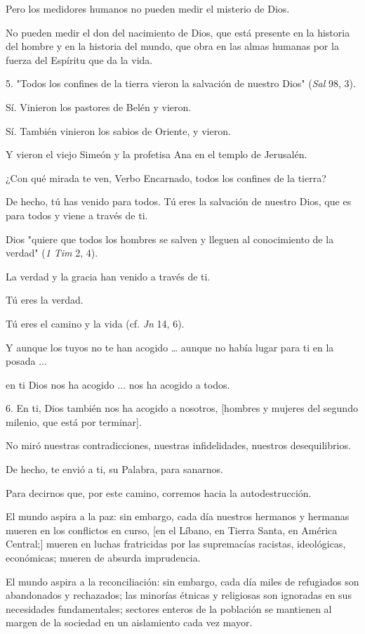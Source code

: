 \begin{body}
\begin{body}
Pero los medidores humanos no pueden medir el misterio de Dios.

No pueden medir el don del nacimiento de Dios, que está presente en la historia del hombre y en la historia del mundo, que obra en las almas humanas por la fuerza del Espíritu que da la vida.

5. "Todos los confines de la tierra vieron la salvación de nuestro Dios" (\emph{Sal} 98, 3).

Sí. Vinieron los pastores de Belén y vieron.

Sí. También vinieron los sabios de Oriente, y vieron.

Y vieron el viejo Simeón y la profetisa Ana en el templo de Jerusalén.

¿Con qué mirada te ven, Verbo Encarnado, todos los confines de la tierra?

De hecho, tú has venido para todos. Tú eres la salvación de nuestro Dios, que es para todos y viene a través de ti.

Dios "quiere que todos los hombres se salven y lleguen al conocimiento de la verdad" (\emph{1 Tim} 2, 4).

La verdad y la gracia han venido a través de ti.

Tú eres la verdad.

Tú eres el camino y la vida (cf. \emph{Jn} 14, 6).

Y aunque los tuyos no te han acogido \ldots{} aunque no había lugar para ti en la posada ...

en ti Dios nos ha acogido ... nos ha acogido a todos.

6. En ti, Dios también nos ha acogido a nosotros, {[}hombres y mujeres del segundo milenio, que está por terminar{]}.

No miró nuestras contradicciones, nuestras infidelidades, nuestros desequilibrios.

De hecho, te envió a ti, su Palabra, para sanarnos.

Para decirnos que, por este camino, corremos hacia la autodestrucción.

El mundo aspira a la paz: sin embargo, cada día nuestros hermanos y hermanas mueren en los conflictos en curso, {[}en el Líbano, en Tierra Santa, en América Central;{]} mueren en luchas fratricidas por las supremacías racistas, ideológicas, económicas; mueren de absurda imprudencia.

El mundo aspira a la reconciliación: sin embargo, cada día miles de refugiados son abandonados y rechazados; las minorías étnicas y religiosas son ignoradas en sus necesidades fundamentales; sectores enteros de la población se mantienen al margen de la sociedad en un aislamiento cada vez mayor.


\end{body}
\end{body}
